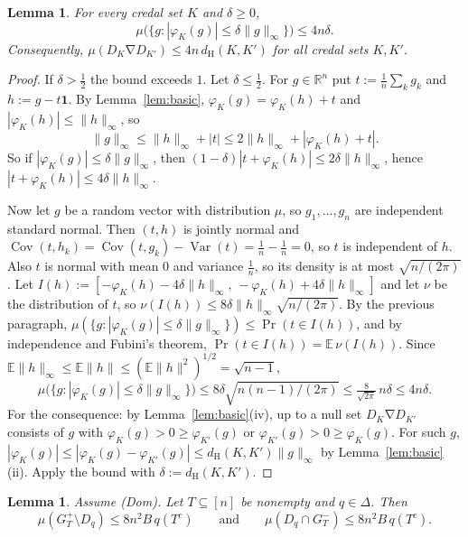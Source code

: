 \documentclass[11pt]{article}
\newtheorem{lemma}[theorem]{Lemma}
\theoremstyle{definition}
\newcommand{\R}{\mathbb R}
\newcommand{\one}{\mathbf 1}
\newcommand{\dH}{d_{\mathrm H}}
\newcommand{\sd}{\mathbin{\nabla}}
\begin{document}
\begin{lemma}\label{lem:thin}
For every credal set $K$ and $\delta\ge 0$,
\[
\mu\big(\{g:|\varphi_K(g)|\le\delta\|g\|_\infty\}\big)\le 4n\delta.
\]
Consequently, $\mu(D_K\sd D_{K'})\le 4n\,\dH(K,K')$ for all credal sets $K,K'$.
\end{lemma}

\begin{proof}
If $\delta>\frac12$ the bound exceeds $1$. Let $\delta\le\frac12$. For $g\in\R^n$ put $t:=\frac1n\sum_kg_k$ and $h:=g-t\one$. By Lemma~\ref{lem:basic}, $\varphi_K(g)=\varphi_K(h)+t$ and $|\varphi_K(h)|\le\|h\|_\infty$, so
\[
\|g\|_\infty\le\|h\|_\infty+|t|\le 2\|h\|_\infty+|\varphi_K(h)+t|.
\]
So if $|\varphi_K(g)|\le\delta\|g\|_\infty$, then $(1-\delta)|t+\varphi_K(h)|\le 2\delta\|h\|_\infty$, hence $|t+\varphi_K(h)|\le 4\delta\|h\|_\infty$.

Now let $g$ be a random vector with distribution $\mu$, so $g_1,\dots,g_n$ are independent standard normal. Then $(t,h)$ is jointly normal and $\operatorname{Cov}(t,h_k)=\operatorname{Cov}(t,g_k)-\operatorname{Var}(t)=\frac1n-\frac1n=0$, so $t$ is independent of $h$. Also $t$ is normal with mean $0$ and variance $\frac1n$, so its density is at most $\sqrt{n/(2\pi)}$. Let $I(h):=[-\varphi_K(h)-4\delta\|h\|_\infty,\,-\varphi_K(h)+4\delta\|h\|_\infty]$ and let $\nu$ be the distribution of $t$, so $\nu(I(h))\le8\delta\|h\|_\infty\sqrt{n/(2\pi)}$. By the previous paragraph, $\mu(\{g:|\varphi_K(g)|\le\delta\|g\|_\infty\})\le\Pr(t\in I(h))$, and by independence and Fubini's theorem, $\Pr(t\in I(h))=\mathbb E\,\nu(I(h))$. Since $\mathbb E\|h\|_\infty\le\mathbb E\|h\|\le(\mathbb E\|h\|^2)^{1/2}=\sqrt{n-1}$,
\[
\mu\big(\{g:|\varphi_K(g)|\le\delta\|g\|_\infty\}\big)\le 8\delta\sqrt{n(n-1)/(2\pi)}\le\tfrac{8}{\sqrt{2\pi}}\,n\delta\le 4n\delta.
\]
For the consequence: by Lemma~\ref{lem:basic}(iv), up to a null set $D_K\sd D_{K'}$ consists of $g$ with $\varphi_K(g)>0\ge\varphi_{K'}(g)$ or $\varphi_{K'}(g)>0\ge\varphi_K(g)$. For such $g$, $|\varphi_K(g)|\le|\varphi_K(g)-\varphi_{K'}(g)|\le\dH(K,K')\|g\|_\infty$ by Lemma~\ref{lem:basic}(ii). Apply the bound with $\delta:=\dH(K,K')$.
\end{proof}

\begin{lemma}\label{lem:faces}
Assume (Dom). Let $T\subseteq[n]$ be nonempty and $q\in\Delta$. Then
\[
\mu(G_T^+\setminus D_q)\le 8n^2B\,q(T^c)\qquad\text{and}\qquad\mu(D_q\cap G_T^-)\le 8n^2B\,q(T^c).
\]
\end{lemma}
\end{document}
